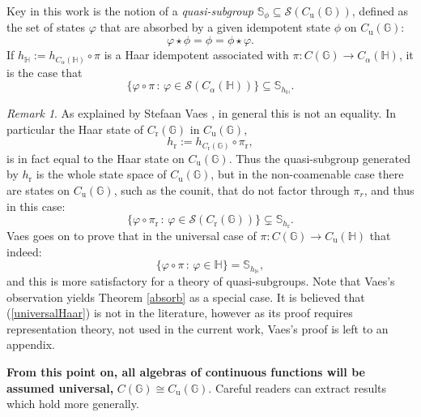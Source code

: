 \documentclass[12pt]{amsart}
\theoremstyle{remark}
\theoremstyle{remark}
\newtheorem{remark}[theorem]{Remark}
\begin{document}
Key in this work is the notion of a \emph{quasi-subgroup} $\mathbb{S}_{\phi}\subseteq \mathcal{S}(C_{\text{u}}(\mathbb{G}))$, defined as the set of states $\varphi$  that are absorbed by a given idempotent state $\phi$ on $C_{\text{u}}(\mathbb{G})$:
        $$\varphi\star \phi=\phi=\phi\star \varphi.$$
       If $h_{\mathbb{H}}:=h_{C_\alpha (\mathbb{H})}\circ \pi$ is a Haar idempotent associated with $\pi:C(\mathbb{G})\to C_\alpha(\mathbb{H})$, it is the case that
$$\{\varphi\circ \pi\,\colon\,\varphi\in\mathcal{S}(C_{\alpha}(\mathbb{H}))\}\subseteq \mathbb{S}_{h_{\mathbb{H}}}.$$
\begin{remark}\label{Vaes}
As explained by Stefaan Vaes  \cite{Vaes}, in general this is not an equality. In particular the Haar state of $C_{\text{r}}(\mathbb{G})$ in $C_{\text{u}}(\mathbb{G})$,
$$h_{\text{r}}:=h_{C_{\text{r}}(\mathbb{G})}\circ \pi_{\text{r}},$$
is in fact equal to the Haar state on $C_{\text{u}}(\mathbb{G})$. Thus the quasi-subgroup generated by $h_{\text{r}}$ is the whole state space of $C_{\text{u}}(\mathbb{G})$, but in the non-coamenable case there are states on $C_{\text{u}}(\mathbb{G})$, such as the counit, that do not factor through $\pi_r$, and thus in this case:
$$\{\varphi\circ \pi_{\text{r}}\,\colon\,\varphi\in \mathcal{S}(C_{\text{r}}(\mathbb{G}))\}\subsetneq \mathbb{S}_{h_{\text{r}}}.$$
 Vaes goes on to prove that in the universal case of $\pi: C(\mathbb{G})\to C_{\text{u}}(\mathbb{H})$ that indeed:
\begin{equation}\{\varphi\circ \pi\,\colon\,\varphi\in\mathbb{H}\}=\mathbb{S}_{h_{\mathbb{H}}},\label{universalHaar}\end{equation}
and this is more satisfactory for a theory of quasi-subgroups.  Note that Vaes's observation yields Theorem \ref{absorb} as a special case. It is believed that (\ref{universalHaar}) is not in the literature, however as its proof requires representation theory, not used in the current work, Vaes's proof is left to an appendix.
\end{remark}






\textbf{From this point on, all algebras of continuous functions will be assumed universal,} $C(\mathbb{G})\cong C_{\text{u}}(\mathbb{G})$. Careful readers can extract results which hold more generally.
\end{document}
